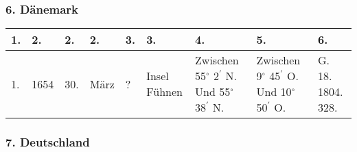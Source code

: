 \documentclass[a4paper, 8pt, oneside, polutonikogreek, german]{article}
\begin{document}
\subsubsection{6. Dänemark}
\begin{table}[H]
    \centering
    \footnotesize
    \begin{tabular}{|l|l|l|l|l|l|p{13mm}|p{13mm}|p{13mm}|}
    \hline
        1. & 2. & 2. & 2. & 3. & 3. & 4. & 5. & 6. \\ \hline
        1. & 1654 & 30. & März & ? & Insel Fühnen & Zwischen 55$^\circ$ 2$^\prime$ N. Und 55$^\circ$ 38$^\prime$ N. & Zwischen 9$^\circ$ 45$^\prime$ O. Und 10$^\circ$ 50$^\prime$ O. & G. 18. 1804. 328. \\ \hline
    \end{tabular}
\end{table}
\subsubsection{7. Deutschland}
\end{document}
